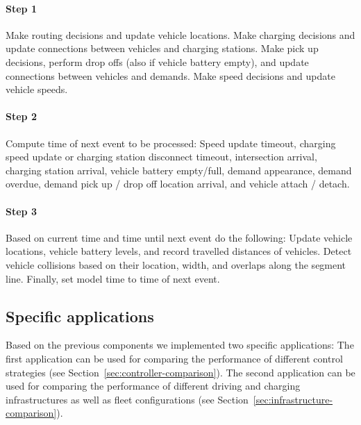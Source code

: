\documentclass[a4paper,twoside]{article}
\begin{document}
	\paragraph{Step 1}
	
	Make routing decisions and update vehicle locations.
	Make charging decisions and update connections between vehicles and charging stations.
	Make pick up decisions, perform drop offs (also if vehicle battery empty), and update connections between vehicles and demands.
	Make speed decisions and update vehicle speeds.
	
	\paragraph{Step 2}
	
	Compute time of next event to be processed:
	Speed update timeout,
	charging speed update or charging station disconnect timeout,
	intersection arrival,
	charging station arrival,
	vehicle battery empty/full,
	demand appearance,
	demand overdue,
	demand pick up / drop off location arrival, and
	vehicle attach / detach.
	
	\paragraph{Step 3}
	
	Based on current time and time until next event do the following:
	Update vehicle locations, vehicle battery levels, and record travelled distances of vehicles.
	Detect vehicle collisions based on their location, width, and overlaps along the segment line.
	Finally, set model time to time of next event.
	
	\subsection{Specific applications}
	\label{sec:application}
	
	Based on the previous components we implemented two specific applications:
	The first application can be used for comparing the performance of different control strategies (see Section~\ref{sec:controller-comparison}).
	The second application can be used for comparing the performance of different driving and charging infrastructures as well as fleet configurations (see Section~\ref{sec:infrastructure-comparison}).

%
	
\end{document}
